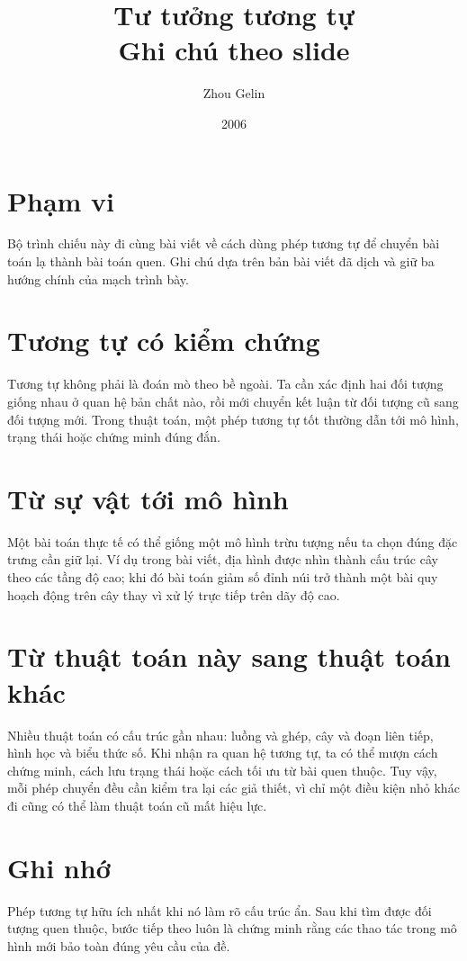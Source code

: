 \documentclass[11pt]{article}
\title{Tư tưởng tương tự\\{\large Ghi chú theo slide}}
\author{Zhou Gelin}
\date{2006}
\begin{document}
\maketitle


\section{Phạm vi}

Bộ trình chiếu này đi cùng bài viết về cách dùng phép tương tự để chuyển bài
toán lạ thành bài toán quen. Ghi chú dựa trên bản bài viết đã dịch và giữ ba
hướng chính của mạch trình bày.

\section{Tương tự có kiểm chứng}

Tương tự không phải là đoán mò theo bề ngoài. Ta cần xác định hai đối tượng
giống nhau ở quan hệ bản chất nào, rồi mới chuyển kết luận từ đối tượng cũ
sang đối tượng mới. Trong thuật toán, một phép tương tự tốt thường dẫn tới mô
hình, trạng thái hoặc chứng minh đúng đắn.

\section{Từ sự vật tới mô hình}

Một bài toán thực tế có thể giống một mô hình trừu tượng nếu ta chọn đúng đặc
trưng cần giữ lại. Ví dụ trong bài viết, địa hình được nhìn thành cấu trúc
cây theo các tầng độ cao; khi đó bài toán giảm số đỉnh núi trở thành một bài
quy hoạch động trên cây thay vì xử lý trực tiếp trên dãy độ cao.

\section{Từ thuật toán này sang thuật toán khác}

Nhiều thuật toán có cấu trúc gần nhau: luồng và ghép, cây và đoạn liên tiếp,
hình học và biểu thức số. Khi nhận ra quan hệ tương tự, ta có thể mượn cách
chứng minh, cách lưu trạng thái hoặc cách tối ưu từ bài quen thuộc. Tuy vậy,
mỗi phép chuyển đều cần kiểm tra lại các giả thiết, vì chỉ một điều kiện nhỏ
khác đi cũng có thể làm thuật toán cũ mất hiệu lực.

\section{Ghi nhớ}

Phép tương tự hữu ích nhất khi nó làm rõ cấu trúc ẩn. Sau khi tìm được đối
tượng quen thuộc, bước tiếp theo luôn là chứng minh rằng các thao tác trong mô
hình mới bảo toàn đúng yêu cầu của đề.
\end{document}

